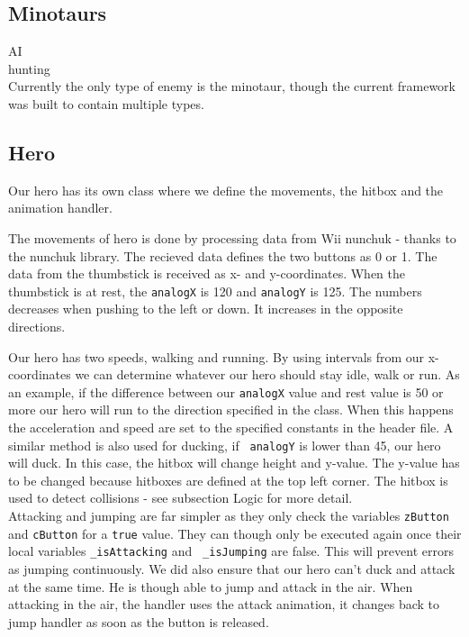\subsection{Minotaurs}
AI\\
hunting\\
Currently the only type of enemy is the minotaur, though the current framework was built to contain multiple types.


\subsection{Hero}
Our hero has its own class where we define the movements, the hitbox and
the animation handler.

The movements of hero is done by processing data from Wii
nunchuk - thanks to the nunchuk library. The recieved data defines the two
buttons as 0 or 1.  The data from the thumbstick is received as x- and
y-coordinates. When the thumbstick is at rest, the {\tt analogX} is 120 and
{\tt analogY} is 125.  The numbers decreases when pushing to the left or down.
It increases in the opposite directions.

Our hero has two speeds, walking and running. By using intervals from our
x-coordinates we can determine whatever our hero should stay idle, walk or run.
As an example, if the difference between our {\tt analogX} value and rest value
is 50 or more our hero will run to the direction specified in the class. When
this happens the acceleration and speed are set to the specified constants
in the header file.  A similar method is also used for ducking, if {\tt
analogY} is lower than 45, our hero will duck. In this case, the hitbox will
change height and y-value. The y-value has to be changed because hitboxes are
defined at the top left corner. The hitbox is used to detect collisions - see subsection
Logic for more detail.
\\

Attacking and jumping are far simpler as they only check the
variables {\tt zButton} and {\tt cButton} for a {\tt true} value. They can though only
be executed again once their local variables {\tt \_isAttacking} and {\tt
\_isJumping} are false. This will prevent errors as jumping
continuously. We did also ensure that our hero can't duck and attack at the same
time. He is though able to jump and attack in the air. When attacking in the air,
the handler uses the attack animation, it changes back to jump handler as soon as
the button is released.

